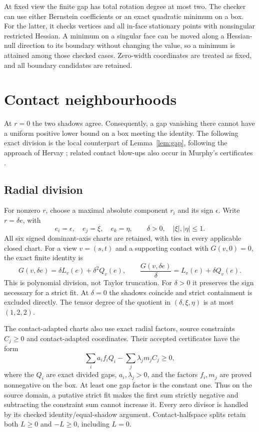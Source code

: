 \documentclass[11pt,a4paper]{article}
\begin{document}
At fixed view the finite gap has total rotation degree at most two. The checker
can use either Bernstein coefficients or an exact quadratic minimum on a box.
For the latter, it checks vertices and all in-face stationary points with
nonsingular restricted Hessian. A minimum on a singular face can be moved along
a Hessian-null direction to its boundary without changing the value, so a
minimum is attained among those checked cases. Zero-width coordinates are
treated as fixed, and all boundary candidates are retained.

\section{Contact neighbourhoods}\label{sec:contacts}
At $r=0$ the two shadows agree. Consequently, a gap vanishing there cannot
have a uniform positive lower bound on a box meeting the identity. The
following exact division is the local counterpart of Lemma~\ref{lem:gap},
following the approach of Hervay \cite{Hervay}; related contact blow-ups
also occur in Murphy's certificates \cite{MurphyMethod}.

\subsection{Radial division}
For nonzero $r$, choose a maximal absolute component $r_i$ and its sign
$\epsilon$. Write $r=\delta e$, with
\[
 e_i=\epsilon,\quad e_j=\xi,\quad e_k=\eta,
 \qquad\delta>0,\quad |\xi|,|\eta|\le1.
\]
All six signed dominant-axis charts are retained, with ties in every applicable
closed chart. For a view $v=(s,t)$ and a supporting contact with $G(v,0)=0$,
the exact finite identity is
\[
 G(v,\delta e)=\delta L_v(e)+\delta^2 Q_v(e),\qquad
 \frac{G(v,\delta e)}{\delta}=L_v(e)+\delta Q_v(e).
\]
This is polynomial division, not Taylor truncation. For $\delta>0$ it preserves
the sign necessary for a strict fit. At $\delta=0$ the shadows coincide and
strict containment is excluded directly. The tensor degree of the quotient in
$(\delta,\xi,\eta)$ is at most $(1,2,2)$.

The contact-adapted charts also use exact radial factors, source constraints
$C_j\ge0$ and contact-adapted coordinates. Their accepted certificates have the
form
\[
 \sum_i a_i f_i Q_i-\sum_j\lambda_j m_j C_j\ge0,
\]
where the $Q_i$ are exact divided gaps, $a_i,\lambda_j>0$, and the factors
$f_i,m_j$ are proved nonnegative on the box. At least one gap factor is the
constant one. Thus on the source domain, a putative strict fit makes the first
sum strictly negative and subtracting the constraint sum cannot increase it.
Every zero divisor is handled by its checked identity/equal-shadow argument.
Contact-halfspace splits retain both $L\ge0$ and $-L\ge0$, including $L=0$.
\end{document}
